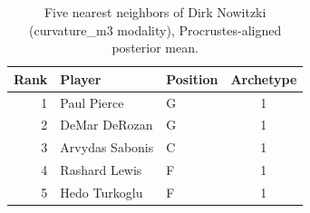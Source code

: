 \begin{table}[htbp]
  \centering\small
  \begin{tabular}{rllc}
    \toprule
    Rank & Player & Position & Archetype \\
    \midrule
    1 & Paul Pierce & G & 1 \\
    2 & DeMar DeRozan & G & 1 \\
    3 & Arvydas Sabonis & C & 1 \\
    4 & Rashard Lewis & F & 1 \\
    5 & Hedo Turkoglu & F & 1 \\
    \bottomrule
  \end{tabular}
  \caption{Five nearest neighbors of Dirk Nowitzki (curvature_m3 modality), Procrustes-aligned posterior mean.}
  \label{tab:Dirk_Nowitzki_neighbors_curvature_m3}
\end{table}

